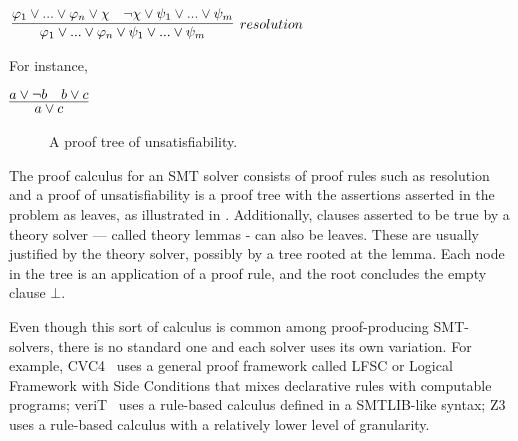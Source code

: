 \documentclass{article}
\begin{document}
	\begin{center}
		$\infer[resolution]{\varphi_1 \lor ... \lor \varphi_n \lor 
			\psi_1 \lor ... \lor \psi_m}
		{\varphi_1 \lor ... \lor \varphi_n \lor \chi & \neg \chi 
			\lor \psi_1 \lor ... \lor \psi_m}$ 
	\end{center}
	For instance,
	\begin{center}
		$\infer{a \lor c}{a \lor \neg b & b \lor c}$
	\end{center}
	
	\begin{figure}[t]
		\caption{A proof tree of unsatisfiability.}
		\label{fig:tree}
	\end{figure}

	The proof calculus for an SMT solver consists 
	of proof rules such as resolution and a 
	proof of unsatisfiability is a proof tree with 
	the assertions asserted in the problem as 
	leaves, as illustrated in .
	Additionally, clauses asserted to 
	be true by a theory solver --- called theory lemmas 
	- can also be leaves. These are usually 
	justified by the theory solver, possibly by 
	a tree rooted at the lemma. Each node in 
	the tree is an application of a proof rule, 
	and the root concludes the empty clause $\bot$.
	
	Even though this sort of calculus is common among 
	proof-producing SMT-solvers, there is no standard 
	one and each solver uses its own variation.
	For example, CVC4~\cite{DBLP:conf/cav/BarrettCDHJKRT11} 
	uses a general proof framework called LFSC or 
	Logical Framework with Side Conditions
	that mixes declarative rules with computable programs; 
	veriT~\cite{10.1007/978-3-642-02959-2_12} uses a 
	rule-based calculus defined in a 
	SMTLIB-like syntax; 
	Z3~\cite{10.1007/978-3-540-78800-3_24} uses a 
	rule-based calculus with a relatively lower level 
	of granularity.
	
\end{document}
